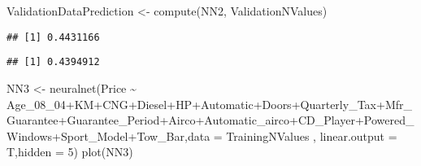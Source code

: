 \documentclass[
]{article}
\newenvironment{Shaded}{\begin{snugshade}}{\end{snugshade}}
\newcommand{\AttributeTok}[1]{\textcolor[rgb]{0.77,0.63,0.00}{#1}}
\newcommand{\DecValTok}[1]{\textcolor[rgb]{0.00,0.00,0.81}{#1}}
\newcommand{\FunctionTok}[1]{\textcolor[rgb]{0.00,0.00,0.00}{#1}}
\newcommand{\NormalTok}[1]{#1}
\newcommand{\OtherTok}[1]{\textcolor[rgb]{0.56,0.35,0.01}{#1}}
\newcommand{\SpecialCharTok}[1]{\textcolor[rgb]{0.00,0.00,0.00}{#1}}
\begin{document}
\begin{Shaded}
\begin{Highlighting}[]
\NormalTok{ValidationDataPrediction }\OtherTok{\textless{}{-}} \FunctionTok{compute}\NormalTok{(NN2, ValidationNValues)}
\end{Highlighting}
\end{Shaded}

\begin{Shaded}
\end{Shaded}

\begin{verbatim}
## [1] 0.4431166
\end{verbatim}

\begin{Shaded}
\end{Shaded}

\begin{verbatim}
## [1] 0.4394912
\end{verbatim}

\begin{Shaded}
\begin{Highlighting}[]
\NormalTok{NN3 }\OtherTok{\textless{}{-}} \FunctionTok{neuralnet}\NormalTok{(Price }\SpecialCharTok{\textasciitilde{}}\NormalTok{ Age\_08\_04}\SpecialCharTok{+}\NormalTok{KM}\SpecialCharTok{+}\NormalTok{CNG}\SpecialCharTok{+}\NormalTok{Diesel}\SpecialCharTok{+}\NormalTok{HP}\SpecialCharTok{+}\NormalTok{Automatic}\SpecialCharTok{+}\NormalTok{Doors}\SpecialCharTok{+}\NormalTok{Quarterly\_Tax}\SpecialCharTok{+}\NormalTok{Mfr\_Guarantee}\SpecialCharTok{+}\NormalTok{Guarantee\_Period}\SpecialCharTok{+}\NormalTok{Airco}\SpecialCharTok{+}\NormalTok{Automatic\_airco}\SpecialCharTok{+}\NormalTok{CD\_Player}\SpecialCharTok{+}\NormalTok{Powered\_Windows}\SpecialCharTok{+}\NormalTok{Sport\_Model}\SpecialCharTok{+}\NormalTok{Tow\_Bar,}\AttributeTok{data =}\NormalTok{ TrainingNValues , }\AttributeTok{linear.output =}\NormalTok{ T,}\AttributeTok{hidden =} \DecValTok{5}\NormalTok{)}
\FunctionTok{plot}\NormalTok{(NN3)}
\end{Highlighting}
\end{Shaded}
\end{document}

